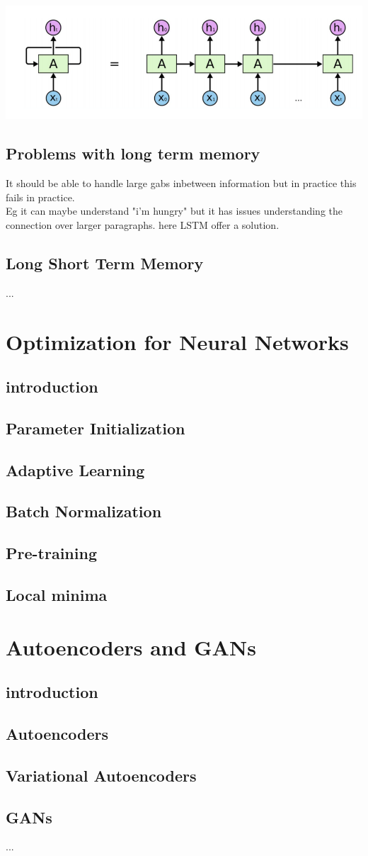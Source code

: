 \documentclass[a4paper,10pt,titlepage]{report}
\begin{document}
\includegraphics[scale=0.1]{RNN_unrolled.png}
\subsection{Problems with long term memory}
It should be able to handle large gabs inbetween information but in practice this fails in practice.\\
Eg it can maybe understand "i'm hungry" but it has issues understanding the connection over larger paragraphs. here LSTM offer a solution.
\subsection{Long Short Term Memory}%
...

\newpage
\section{Optimization for Neural Networks}
\subsection{introduction}
\subsection{Parameter Initialization}
\subsection{Adaptive Learning}
\subsection{Batch Normalization}
\subsection{Pre-training}
\subsection{Local minima}

\newpage
\section{Autoencoders and GANs}
\subsection{introduction}
\subsection{Autoencoders}
\subsection{Variational Autoencoders}
\subsection{GANs}
...
\end{document}

